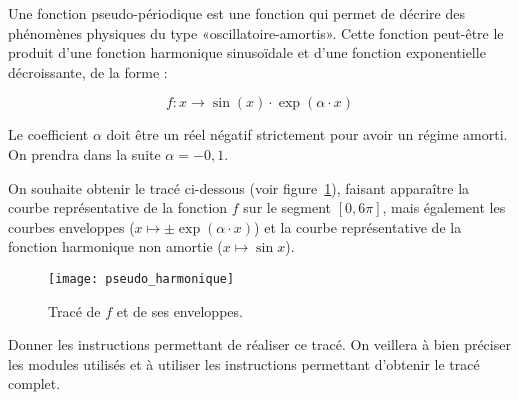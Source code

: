 Une fonction pseudo-périodique est une fonction qui permet de décrire des phénomènes physiques du type «oscillatoire-amortis». Cette fonction peut-être le produit d'une fonction harmonique sinusoïdale et d'une fonction exponentielle décroissante, de la forme : 

\begin{equation*}
f:x\to \sin(x)\cdot \exp \left(\alpha \cdot x\right)
\end{equation*}


Le coefficient $\alpha$ doit être un réel négatif strictement pour avoir un régime amorti. On prendra dans la suite $\alpha=-0,1$. 

\bigskip{}
On souhaite obtenir le tracé ci-dessous (voir figure~\ref{PLT-001:fig:amorti}), faisant apparaître la courbe représentative de la fonction $f$ sur le segment $[0,6\pi]$, mais également les courbes enveloppes ($x\mapsto \pm \exp \left(\alpha \cdot x\right)$) et la courbe représentative de la fonction harmonique non amortie ($x\mapsto \sin x$).

\begin{figure}[h!]
\begin{center}
\texttt{[image: pseudo\_harmonique]}
\caption{Tracé de $f$ et de ses enveloppes.}
\label{PLT-001:fig:amorti}
\end{center}
\end{figure}


\question{} Donner les instructions permettant de réaliser ce tracé. On veillera à bien préciser les modules utilisés et à utiliser les instructions permettant d'obtenir le tracé complet.
